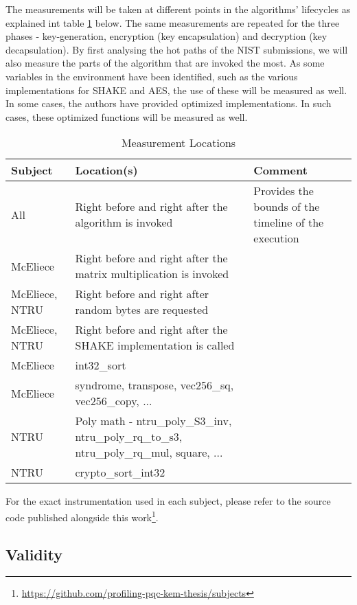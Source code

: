 The measurements will be taken at different points in the algorithms' lifecycles as explained int table \ref{table:method:instrumentation} below. The same measurements are repeated for the three phases - key-generation, encryption (key encapsulation) and decryption (key decapsulation). By first analysing the hot paths of the NIST submissions, we will also measure the parts of the algorithm that are invoked the most. As some variables in the environment have been identified, such as the various implementations for SHAKE and AES, the use of these will be measured as well. In some cases, the authors have provided optimized implementations. In such cases, these optimized functions will be measured as well.

\begin{table}[H]
    \centering
    \begin{tabular}{l|p{3cm}|p{3cm}}
        Subject & Location(s) & Comment \\
        \hline
        All & Right before and right after the algorithm is invoked & Provides the bounds of the timeline of the execution \\
        McEliece & Right before and right after the matrix multiplication is invoked & \\
        McEliece, NTRU & Right before and right after random bytes are requested & \\
        McEliece, NTRU & Right before and right after the SHAKE implementation is called & \\
        McEliece & int32_sort & \\
        McEliece & syndrome, transpose, vec256_sq, vec256_copy, ... &\\
        NTRU & Poly math - ntru_poly_S3_inv, ntru_poly_rq_to_s3, ntru_poly_rq_mul, square, ...& \\
        NTRU & crypto_sort_int32 & \\
    \end{tabular}
    \caption{Measurement Locations}
    \label{table:method:instrumentation}
\end{table}

For the exact instrumentation used in each subject, please refer to the source code published alongside this work\footnote{\href{https://github.com/profiling-pqc-kem-thesis/subjects}{https://github.com/profiling-pqc-kem-thesis/subjects}}.

\subsection{Validity}

